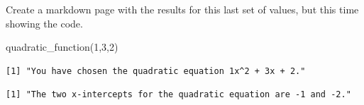 \documentclass[
  letterpaper,
  DIV=11,
  numbers=noendperiod]{scrartcl}
\newenvironment{Shaded}{\begin{snugshade}}{\end{snugshade}}
\newcommand{\DecValTok}[1]{\textcolor[rgb]{0.68,0.00,0.00}{#1}}
\newcommand{\FunctionTok}[1]{\textcolor[rgb]{0.28,0.35,0.67}{#1}}
\newcommand{\NormalTok}[1]{\textcolor[rgb]{0.00,0.23,0.31}{#1}}
\begin{document}
Create a markdown page with the results for this last set of values, but
this time showing the code.

\begin{Shaded}
\begin{Highlighting}[]
\FunctionTok{quadratic\_function}\NormalTok{(}\DecValTok{1}\NormalTok{,}\DecValTok{3}\NormalTok{,}\DecValTok{2}\NormalTok{)}
\end{Highlighting}
\end{Shaded}

\begin{verbatim}
[1] "You have chosen the quadratic equation 1x^2 + 3x + 2."
\end{verbatim}

\begin{verbatim}
[1] "The two x-intercepts for the quadratic equation are -1 and -2."
\end{verbatim}
\end{document}
